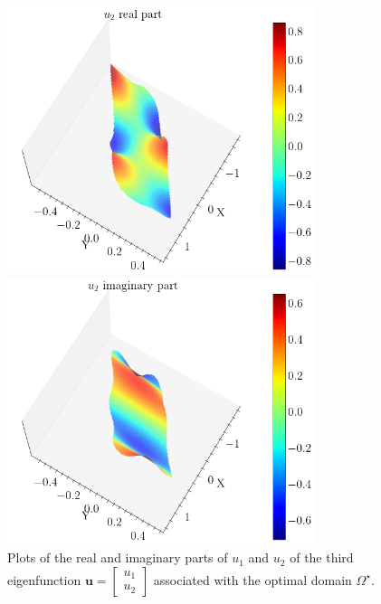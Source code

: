 \begin{figure}[!htb]
    \begin{minipage}[b]{0.45\textwidth}
        \centering
        \includegraphics[width=0.8\textwidth]{Images/Dirac/smooth/optimal_lambda3_m_1_u2_re.png}
    \end{minipage}
    \hfill
    \begin{minipage}[b]{0.45\textwidth}
        \centering
        \includegraphics[width=0.8\textwidth]{Images/Dirac/smooth/optimal_lambda3_m_1_u2_im.png}
    \end{minipage}
    \caption{Plots of the real and imaginary parts of \(u_1\) and \(u_2\) of the third eigenfunction \(\mathbf{u}=\begin{bmatrix} u_1\\ u_2 \end{bmatrix}\) associated with the optimal domain \(\Omega^\star\).}
    \label{dirac_optimal_plots_eigenfunctions}
\end{figure}

